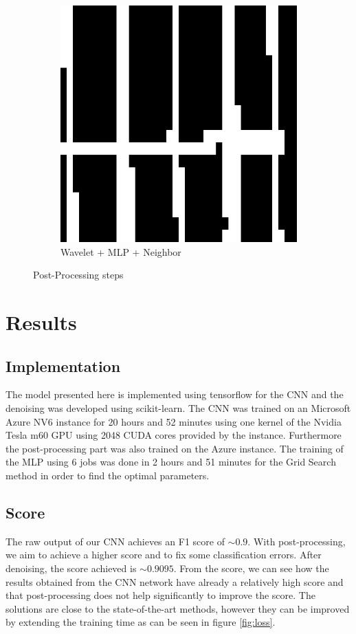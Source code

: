\documentclass[10pt,conference,compsocconf]{IEEEtran}
\begin{document}
\begin{figure}
\begin{subfigure}{.3\columnwidth}
  \includegraphics[width=.8\linewidth]{final_res.png}
  \caption{Wavelet + MLP + Neighbor}
\end{subfigure}
\caption{Post-Processing steps}
\label{fig:denoising}
\end{figure}


\section{Results}
\label{sec:results}
\subsection{Implementation}
The model presented here is implemented using tensorflow for the CNN and the denoising was developed using scikit-learn. The CNN was trained on an Microsoft Azure NV6 instance for 20 hours and 52 minutes using one kernel of the Nvidia Tesla m60 GPU using 2048 CUDA cores provided by the instance. Furthermore the post-processing part was also trained on the Azure instance. The training of the MLP using 6 jobs was done in 2 hours and 51 minutes for the Grid Search method in order to find the optimal parameters.
\subsection{Score}
The raw output of our CNN achieves an F1 score of $\sim 0.9$. With post-processing, we aim to achieve a higher score and to fix some classification errors. After denoising, the score achieved is $\sim 0.9095$. From the score, we can see how the results obtained from the CNN network have already a relatively high score and that post-processing does not help significantly to improve the score. The solutions are close to the state-of-the-art methods, however they can be improved by extending the training time as can be seen in figure \ref{fig:loss}.
\end{document}
